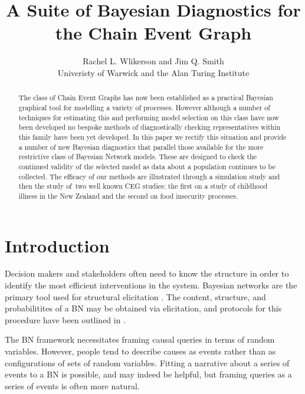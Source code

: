 \documentclass[12pt]{article}
\begin{document}
\title{A Suite of Bayesian Diagnostics for the Chain Event Graph}

\author{Rachel L. Wlikerson and Jim Q. Smith \\
Univeristy of Warwick and the Alan Turing Institute}
\maketitle

\begin{abstract}
The class of Chain Event Graphs has now been established as a practical
Bayesian graphical tool for modelling a variety of processes. However
although a number of techniques for estimating this and performing model
selection on this class have now been developed no bespoke methods of
diagnostically checking representatives within this family have been yet
developed. In this paper we rectify this situation and provide a number of
new Bayesian diagnostics that parallel those available for the more
restrictive class of Bayesian Network models. These are designed to check
the continued validity of the selected model as data about a population
continues to be collected. The efficacy of our methods are illustrated
through a simulation study and then the study of\ two well known CEG
studies: the first on a study of childhood illness in the New Zealand and
the second on food insecurity processes.
\end{abstract}

\section{Introduction }

Decision makers and stakeholders often need to know the structure in order to identify the most efficient interventions in the system. Bayesian networks are the primary tool used for structural elicitation \cite{Lord2016,Pitchforth2013}. The content, structure, and probabilitites of a BN may be obtained via elicitation, and protocols for this procedure have been outlined in \cite{EFSA} \cite{Ohagan}. 

The BN framework necessitates framing causal queries in terms of random variables. However, people tend to describe causes as events rather than as configurations of sets of random variables. Fitting a narrative about a series of events to a BN is possible, and may indeed be helpful, but framing queries as a series of events is often more natural. 

\end{document}
